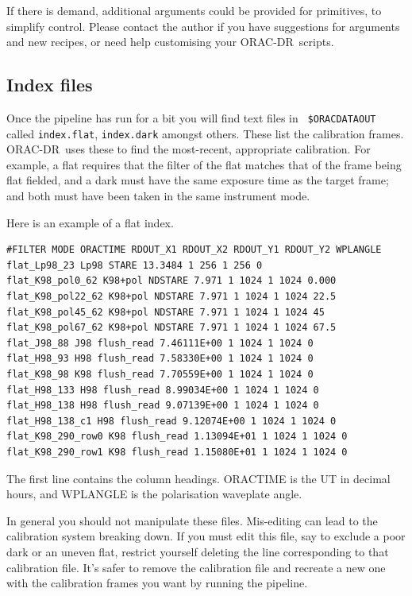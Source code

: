 \documentclass[twoside,11pt]{article}
\newcommand{\xlabel}[1]{}
\renewcommand{\_}{\texttt{\symbol{95}}}
\newcommand{\ORACDR}{{\footnotesize ORAC-DR}}
\begin{document}
If there is demand, additional arguments could be provided for
primitives, to simplify control.  Please contact the author if you
have suggestions for arguments and new recipes, or need help
customising your \ORACDR\ scripts.

\subsection{\xlabel{index_files}Index files\label{index_files}}

Once the pipeline has run for a bit you will find text files in {\tt
\$ORAC\_DATA\_OUT} called {\tt index.flat}, {\tt index.dark} amongst
others.  These list the calibration frames.  \ORACDR\ uses these to
find the most-recent, appropriate calibration.  For example, a flat
requires that the filter of the flat matches that of the frame being
flat fielded, and a dark must have the same exposure time as the
target frame; and both must have been taken in the same instrument
mode.

Here is an example of a flat index.

\begin{verbatim}
#FILTER MODE ORACTIME RDOUT_X1 RDOUT_X2 RDOUT_Y1 RDOUT_Y2 WPLANGLE
flat_Lp98_23 Lp98 STARE 13.3484 1 256 1 256 0
flat_K98_pol0_62 K98+pol NDSTARE 7.971 1 1024 1 1024 0.000
flat_K98_pol22_62 K98+pol NDSTARE 7.971 1 1024 1 1024 22.5
flat_K98_pol45_62 K98+pol NDSTARE 7.971 1 1024 1 1024 45
flat_K98_pol67_62 K98+pol NDSTARE 7.971 1 1024 1 1024 67.5
flat_J98_88 J98 flush_read 7.46111E+00 1 1024 1 1024 0
flat_H98_93 H98 flush_read 7.58330E+00 1 1024 1 1024 0
flat_K98_98 K98 flush_read 7.70559E+00 1 1024 1 1024 0
flat_H98_133 H98 flush_read 8.99034E+00 1 1024 1 1024 0
flat_H98_138 H98 flush_read 9.07139E+00 1 1024 1 1024 0
flat_H98_138_c1 H98 flush_read 9.12074E+00 1 1024 1 1024 0
flat_K98_290_row0 K98 flush_read 1.13094E+01 1 1024 1 1024 0
flat_K98_290_row1 K98 flush_read 1.15080E+01 1 1024 1 1024 0
\end{verbatim}
The first line contains the column headings.  ORACTIME is the UT in
decimal hours, and WPLANGLE is the polarisation waveplate angle.

In general you should not manipulate these files.  Mis-editing can
lead to the calibration system breaking down.  If you must edit this
file, say to exclude a poor dark or an uneven flat, restrict yourself
deleting the line corresponding to that calibration file.  It's safer
to remove the calibration file and recreate a new one with the
calibration frames you want by running the pipeline.
\end{document}
